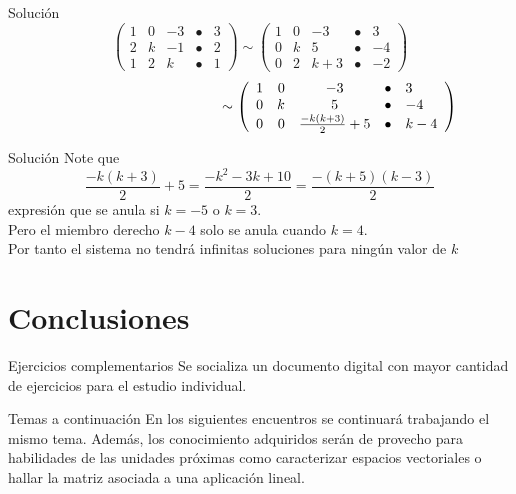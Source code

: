\documentclass{beamer}
\begin{document}
\begin{frame}{Solución}
  $$\left(
    \begin{array}{rrrrl}
        1 & 0 & -3 & \bullet & 3 \\
        2 & k & -1 & \bullet & 2 \\
        1 & 2 & k  & \bullet & 1
      \end{array}
    \right) \sim \left(
    \begin{array}{rrrrl}
        1 & 0 & -3  & \bullet & 3  \\
        0 & k & 5   & \bullet & -4 \\
        0 & 2 & k+3 & \bullet & -2
      \end{array}
    \right)$$
  $$\hspace*{4cm}
    \sim \left(
    \begin{array}{rrcrl}
        1 & 0 & -3                  & \bullet & 3   \\
        0 & k & 5                   & \bullet & -4  \\
        0 & 0 & \frac{-k(k+3)}{2}+5 & \bullet & k-4
      \end{array}
    \right)$$
\end{frame}

\begin{frame}{Solución}
  Note que
  $$\frac{-k(k+3)}{2}+5 = \frac{-k^2-3k+10}{2}=\frac{-(k+5)(k-3)}{2}$$
  expresión que se anula si $k=-5$ o $k=3$.\\
  Pero el miembro derecho $k-4$ solo se anula cuando $k=4$.\\
  Por tanto el sistema no tendrá infinitas soluciones para ningún valor de $k$

\end{frame}

\section{Conclusiones}
\begin{frame}{Ejercicios complementarios}
  Se socializa un documento digital con mayor cantidad de ejercicios para el estudio individual.
\end{frame}
\begin{frame}{Temas a continuación}
  En los siguientes encuentros se continuará trabajando el mismo tema. Además, los conocimiento
  adquiridos serán de provecho para habilidades de las unidades próximas como
  caracterizar espacios vectoriales o hallar la matriz asociada a una aplicación lineal.
\end{frame}
\end{document}

